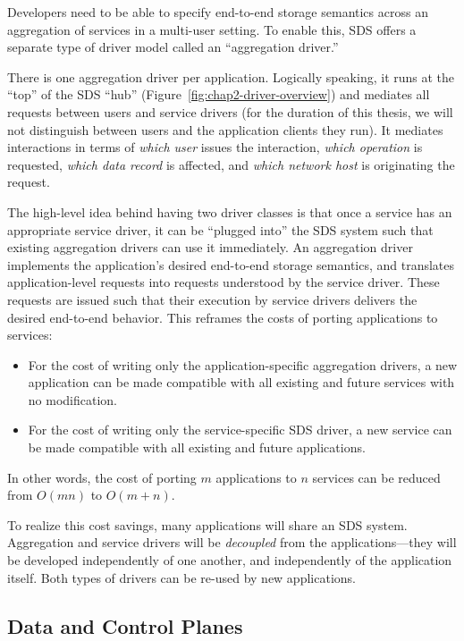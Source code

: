 Developers need to be able to specify
end-to-end storage semantics across an aggregation of services
in a multi-user setting.  To enable this,
SDS offers a separate type of driver model called an ``aggregation
driver.''

There is one aggregation driver per application.  Logically speaking, it runs at
the ``top'' of the SDS ``hub'' (Figure~\ref{fig:chap2-driver-overview})
and mediates all requests between users and
service drivers (for the duration of this thesis, we will not
distinguish between users and the application clients
they run).  It mediates interactions in terms of \emph{which user} issues the
interaction, \emph{which operation} is requested, \emph{which data
record} is affected, and \emph{which network host} is originating the request.

The high-level idea behind having two driver classes is that once a service has an appropriate service driver,
it can be ``plugged into'' the SDS system such that existing aggregation drivers
can use it immediately.  An aggregation driver implements the application's desired end-to-end storage
semantics, and translates
application-level requests into requests understood by the service driver.  These
requests are issued such that their execution
by service drivers delivers the desired end-to-end behavior.  This reframes the
costs of porting applications to services:

\begin{itemize}
    \item For the cost of writing only the application-specific
aggregation drivers, a new application can be made
compatible with all existing and future services with no modification.
    \item For the cost of writing only the service-specific SDS driver, a new
service can be made compatible with all existing and future applications.
\end{itemize}

In other words, the cost of porting $m$ applications to $n$ services can be
reduced from $O(mn)$ to $O(m+n)$.

To realize this cost savings, many applications will share an SDS system.  Aggregation and service drivers
will be \emph{decoupled} from the applications---they will be
developed independently of one another, and independently of the
application itself.  Both types of drivers can be re-used by new applications.

\subsection{Data and Control Planes}

